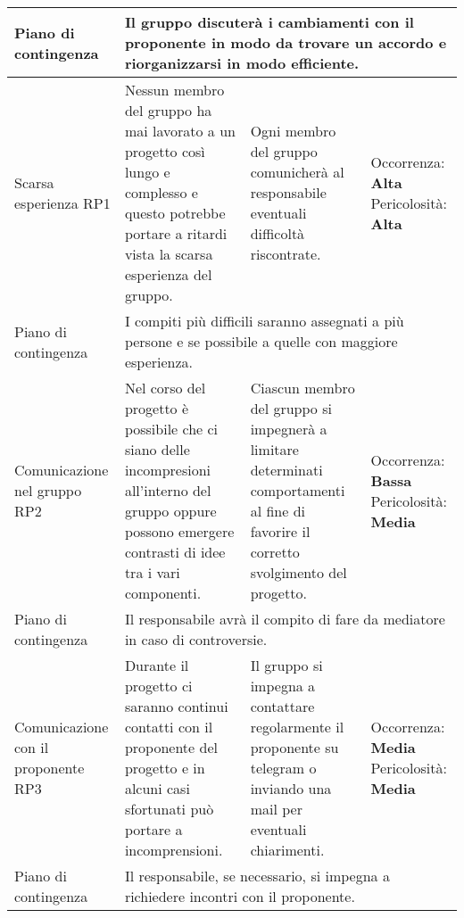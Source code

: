 \begin{center}
\begin{longtable}{|p{}|p{}|p{}|p{}|}
		\hline
		\centering Piano di contingenza & \multicolumn{3}{p{0.83\textwidth}}{Il gruppo discuterà i cambiamenti con il proponente in modo da trovare un accordo e riorganizzarsi in modo efficiente.} \\
		\hline
		\centering Scarsa esperienza RP1& Nessun membro del gruppo ha mai lavorato a un progetto così lungo e complesso e questo potrebbe portare a ritardi vista la scarsa esperienza del gruppo. & Ogni membro del gruppo comunicherà al responsabile eventuali difficoltà riscontrate. & Occorrenza: \textbf{Alta} Pericolosità: \textbf{Alta}\\
		\hline
		\centering Piano di contingenza & \multicolumn{3}{p{0.83\textwidth}}{I compiti più difficili saranno assegnati a più persone e se possibile a quelle con maggiore esperienza.} \\
		\hline
		\centering Comunicazione nel gruppo RP2& Nel corso del progetto è possibile che ci siano delle incompresioni all'interno del gruppo oppure possono emergere contrasti di idee tra i vari componenti. &Ciascun membro del gruppo si impegnerà a limitare determinati comportamenti al fine di favorire il corretto svolgimento del progetto. & Occorrenza: \textbf{Bassa} Pericolosità: \textbf{Media}\\
		\hline
		\centering Piano di contingenza & \multicolumn{3}{p{0.83\textwidth}}{Il responsabile avrà il compito di fare da mediatore in caso di controversie.} \\
		\hline
		\centering Comunicazione con il proponente RP3& Durante il progetto ci saranno continui contatti con il proponente del progetto e in alcuni casi sfortunati può portare a incomprensioni.& Il gruppo si impegna a contattare regolarmente il proponente su telegram o inviando una mail per eventuali chiarimenti. & Occorrenza: \textbf{Media} Pericolosità: \textbf{Media}\\
		\hline
		\centering Piano di contingenza & \multicolumn{3}{p{0.83\textwidth}}{Il responsabile, se necessario, si impegna a richiedere incontri con il proponente.} \\
		\hline			
	\end{longtable}
\end{center}
